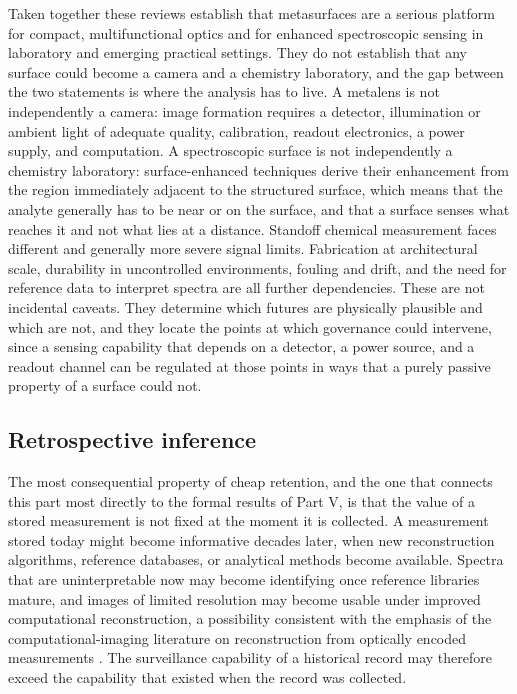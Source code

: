 \documentclass[11pt]{article}
\theoremstyle{plain}
\theoremstyle{definition}
\theoremstyle{remark}
\begin{document}
Taken together these reviews establish that metasurfaces are a serious platform for compact, multifunctional optics and for enhanced spectroscopic sensing in laboratory and emerging practical settings. They do not establish that any surface could become a camera and a chemistry laboratory, and the gap between the two statements is where the analysis has to live. A metalens is not independently a camera: image formation requires a detector, illumination or ambient light of adequate quality, calibration, readout electronics, a power supply, and computation. A spectroscopic surface is not independently a chemistry laboratory: surface-enhanced techniques derive their enhancement from the region immediately adjacent to the structured surface, which means that the analyte generally has to be near or on the surface, and that a surface senses what reaches it and not what lies at a distance. Standoff chemical measurement faces different and generally more severe signal limits. Fabrication at architectural scale, durability in uncontrolled environments, fouling and drift, and the need for reference data to interpret spectra are all further dependencies. These are not incidental caveats. They determine which futures are physically plausible and which are not, and they locate the points at which governance could intervene, since a sensing capability that depends on a detector, a power source, and a readout channel can be regulated at those points in ways that a purely passive property of a surface could not.

\subsection{Retrospective inference}

The most consequential property of cheap retention, and the one that connects this part most directly to the formal results of Part V, is that the value of a stored measurement is not fixed at the moment it is collected. A measurement stored today might become informative decades later, when new reconstruction algorithms, reference databases, or analytical methods become available. Spectra that are uninterpretable now may become identifying once reference libraries mature, and images of limited resolution may become usable under improved computational reconstruction, a possibility consistent with the emphasis of the computational-imaging literature on reconstruction from optically encoded measurements \cite{hu2024,roques2024}. The surveillance capability of a historical record may therefore exceed the capability that existed when the record was collected.
\end{document}
